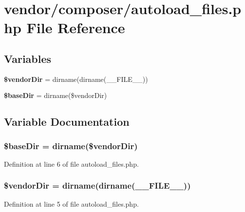 \section{vendor/composer/autoload\+\_\+files.php File Reference}
\label{autoload__files_8php}
\subsection*{Variables}
\begin{DoxyCompactItemize}
\item 
{\bf \$vendor\+Dir} = dirname(dirname(\+\_\+\+\_\+\+F\+I\+L\+E\+\_\+\+\_\+))
\item 
{\bf \$base\+Dir} = dirname(\$vendor\+Dir)
\end{DoxyCompactItemize}


\subsection{Variable Documentation}
\subsubsection[{\$base\+Dir}]{\setlength{\rightskip}{0pt plus 5cm}\$base\+Dir = dirname(\$vendor\+Dir)}\label{autoload__files_8php_a873fc20cf44ad2f766893e95aab8df78}


Definition at line 6 of file autoload\+\_\+files.\+php.

\subsubsection[{\$vendor\+Dir}]{\setlength{\rightskip}{0pt plus 5cm}\$vendor\+Dir = dirname(dirname(\+\_\+\+\_\+\+F\+I\+L\+E\+\_\+\+\_\+))}\label{autoload__files_8php_a7fbc3633c79d7461383710e09d497fb0}


Definition at line 5 of file autoload\+\_\+files.\+php.

